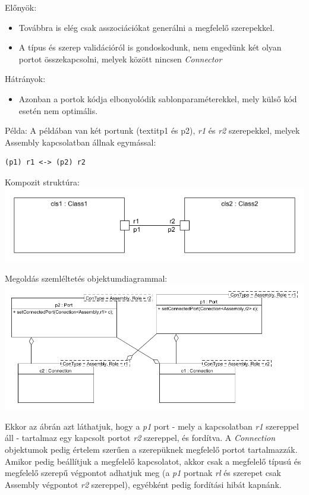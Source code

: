 \documentclass[a4paper,12pt]{report}
\begin{document}
\begin{enumerate}
Előnyök:
\begin{itemize}
\item Továbbra is elég csak asszociációkat generálni a megfelelő szerepekkel.
\item A típus és szerep validációról is gondoskodunk, nem engedünk két olyan portot összekapcsolni, melyek között nincsen \textit{Connector}
\end{itemize}
Hátrányok:
\begin{itemize}
\item Azonban a portok kódja elbonyolódik sablonparaméterekkel, mely külső kód esetén nem optimális.
\end{itemize}
Példa:
A példában van két portunk (textit{p1 és p2}), \textit{r1} és \textit{r2} szerepekkel, melyek Assembly kapcsolatban állnak egymással:
\begin{lstlisting}
(p1) r1 <-> (p2) r2
\end{lstlisting}
Kompozit struktúra: \\
\includegraphics[scale=0.6]{conn_role_comp.png}

Megoldás szemléltetés objektumdiagrammal: \\
\includegraphics[scale=0.5]{conn_role.png}

Ekkor az ábrán azt láthatjuk, hogy a \textit{p1} port - mely a kapcsolatban \textit{r1} szereppel áll - tartalmaz egy kapcsolt portot \textit{r2 }szereppel, és fordítva. A \textit{Connection} objektumok pedig értelem szerűen a szerepüknek megfelelő portot tartalmazzák. Amikor pedig beállítjuk a megfelelő kapcsolatot, akkor csak a megfelelő típusú és megfelelő szerepű végpontot adhatjuk meg (a \textit{p1} portnak \textit{rl} és szerepet csak Assembly végpontot \textit{r2} szereppel), egyébként pedig fordítási hibát kapnánk. 
\end{enumerate}
\end{document}
